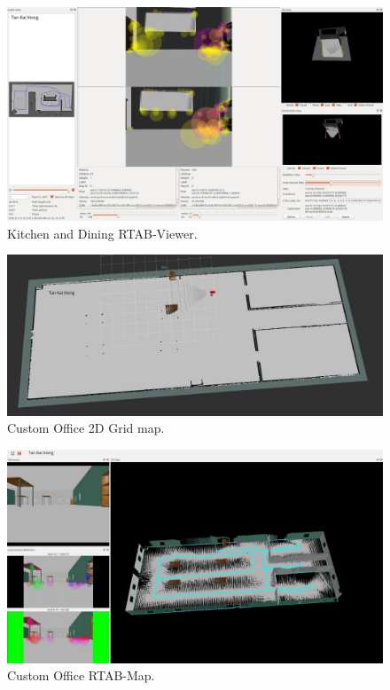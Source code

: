 \documentclass[10pt,journal,compsoc]{IEEEtran}
\begin{document}
\begin{figure}[thpb]
      \centering
      \includegraphics[width=\linewidth]{kitchen_loopclosure.png}
      \caption{Kitchen and Dining RTAB-Viewer.}
      \label{fig:robot7}
\end{figure}

\begin{figure}[thpb]
      \centering
      \includegraphics[width=\linewidth]{custom_office_gridmap.png}
      \caption{Custom Office 2D Grid map.}
      \label{fig:robot8}
\end{figure}

\begin{figure}[thpb]
      \centering
      \includegraphics[width=\linewidth]{custom_office_rtabmap.png}
      \caption{Custom Office RTAB-Map.}
      \label{fig:robot9}
\end{figure}
\end{document}

